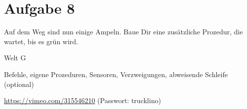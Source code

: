 \pagebreak

\section{Aufgabe 8}
\label{sec:exercises:8}

Auf dem Weg sind nun einige Ampeln. Baue Dir eine zusätzliche Prozedur, die wartet, bis es grün wird.

\begin{description}[noitemsep]
  \item[Welt wählen:] Welt G
  \item[Du brauchst:] Befehle, eigene Prozeduren, Sensoren, Verzweigungen, abweisende Schleife (optional)
  \item[Video:] \url{https://vimeo.com/315546210} (Passwort: trucklino)
\end{description}

